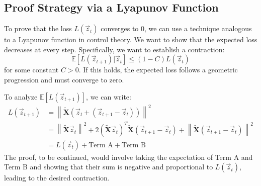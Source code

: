 \documentclass[11pt]{article}
\newcommand{\E}{\mathbb{E}}
\newcommand{\mat}[1]{\mathbf{#1}}
\newcommand{\norm}[1]{\left\lVert#1\right\rVert}
\begin{document}
\subsection{Proof Strategy via a Lyapunov Function}
To prove that the loss $L(\vec{z}_t)$ converges to 0, we can use a technique analogous to a Lyapunov function in control theory. We want to show that the expected loss decreases at every step. Specifically, we want to establish a contraction:
\begin{equation}
    \E[L(\vec{z}_{t+1}) | \vec{z}_t] \le (1 - C) L(\vec{z}_t)
\end{equation}
for some constant $C > 0$. If this holds, the expected loss follows a geometric progression and must converge to zero.

To analyze $\E[L(\vec{z}_{t+1})]$, we can write:
\begin{align*}
    L(\vec{z}_{t+1}) &= \norm{\tilde{\mat{X}}(\vec{z}_t + (\vec{z}_{t+1} - \vec{z}_t))}^2 \\
    &= \norm{\tilde{\mat{X}}\vec{z}_t}^2 + 2(\tilde{\mat{X}}\vec{z}_t)^T \tilde{\mat{X}}(\vec{z}_{t+1} - \vec{z}_t) + \norm{\tilde{\mat{X}}(\vec{z}_{t+1} - \vec{z}_t)}^2 \\
    &= L(\vec{z}_t) + \text{Term A} + \text{Term B}
\end{align*}
The proof, to be continued, would involve taking the expectation of Term A and Term B and showing that their sum is negative and proportional to $L(\vec{z}_t)$, leading to the desired contraction.
\end{document}

